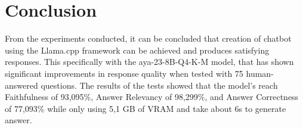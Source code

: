 \section{Conclusion}
\label{sec:kesimpulan}


From the experiments conducted, it can be concluded that creation of chatbot using the Llama.cpp framework can be achieved and produces satisfying responses. This specifically with the aya-23-8B-Q4-K-M model, that has shown significant improvements in response quality when tested with 75 human-answered questions. The results of the tests showed that the model's reach Faithfulness of 93,095\%, Answer Relevancy of 98,299\%, and Answer Correctness of 77,093\% while only using 5,1 GB of VRAM and take about 6s to generate answer.
